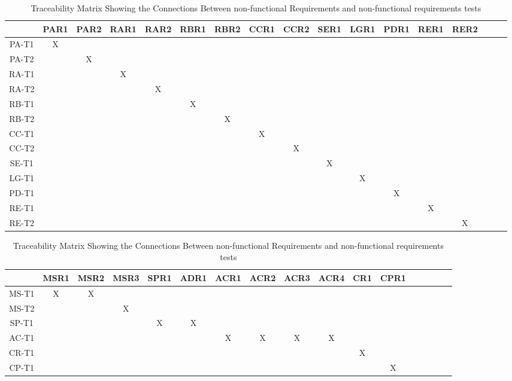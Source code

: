 \documentclass[12pt, titlepage]{article}
\begin{document}
\begin{landscape}
\begin{table}[h!]
\centering
\begin{tabular}{|c|c|c|c|c|c|c|c|c|c|c|c|c|c|c|c|c|}
\hline
	& PAR1 & PAR2 & RAR1 & RAR2 & RBR1 & RBR2 & CCR1 & CCR2 & SER1 & LGR1 & PDR1 & RER1 & RER2\\
\hline
PA-T1        &X & & & & & & & & & & & & \\ \hline
PA-T2        & &X & & & & & & & & & & & \\ \hline
RA-T1        & & &X & & & & & & & & & & \\ \hline
RA-T2        & & & &X & & & & & & & & & \\ \hline
RB-T1        & & & & &X & & & & & & & & \\ \hline
RB-T2        & & & & & &X & & & & & & & \\ \hline
CC-T1        & & & & & & &X & & & & & & \\ \hline
CC-T2        & & & & & & & &X & & & & & \\ \hline
SE-T1        & & & & & & & & &X & & & & \\ \hline
LG-T1        & & & & & & & & & &X & & & \\ \hline
PD-T1        & & & & & & & & & & &X & & \\ \hline
RE-T1        & & & & & & & & & & & &X & \\ \hline
RE-T2        & & & & & & & & & & & & &X \\ \hline

\end{tabular}
\caption{Traceability Matrix Showing the Connections Between non-functional Requirements and non-functional requirements tests}
\label{Table:A_trace}
\end{table}
\end{landscape}

\begin{landscape}
\begin{table}[h!]
\centering
\begin{tabular}{|c|c|c|c|c|c|c|c|c|c|c|c|c|c|c|c|c|}
\hline
	& MSR1 & MSR2 & MSR3 & SPR1 & ADR1 & ACR1 & ACR2 & ACR3 & ACR4 & CR1 & CPR1 \\
\hline
MS-T1        &X &X & & & & & & & & &  \\ \hline
MS-T2        & & &X & & & & & & & &  \\ \hline
SP-T1        & & & &X &X & & & & & &  \\ \hline
AC-T1        & & & & & & X&X &X &X & & \\ \hline
CR-T1        & & & & & & & & & &X &  \\ \hline
CP-T1        & & & & & & & & & & &X \\ \hline

\end{tabular}
\caption{Traceability Matrix Showing the Connections Between non-functional Requirements and non-functional requirements tests}
\label{Table:A_trace}
\end{table}
\end{landscape}
\end{document}
